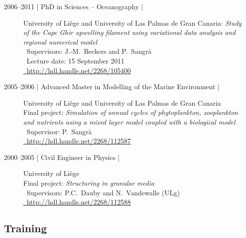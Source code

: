 \documentclass[10pt,a4paper,svgnames]{article}
\begin{document}
\begin{description}
\item[2006--2011 | PhD in Sciences -- Oceanography |] University of Li\`{e}ge and University of Las Palmas de Gran Canaria: \emph{Study of the Cape Ghir upwelling filament using variational data analysis and regional numerical model}\\
\faUser~Supervisors: J.-M.~Beckers and P.~Sangr\`{a}\\
\faCalendar~Lecture date: 15 September 2011\\
\href{http://hdl.handle.net/2268/105400}{\faLink~http://hdl.handle.net/2268/105400}

\item[2005--2006 | Advanced Master in Modelling of the Marine Environment |] University of Li\`{e}ge and University of Las Palmas de Gran Canaria\\
Final project: \emph{Simulation of annual cycles of phytoplankton, zooplankton and nutrients using a mixed layer model coupled with a biological model}\\
\faUser~Supervisor: P.~Sangr\`{a}\\
\href{http://hdl.handle.net/2268/112587}{\faLink~http://hdl.handle.net/2268/112587}

\item[2000--2005 | Civil Engineer in Physics | ] University of Li\`{e}ge\\
Final project: \emph{Structuring in granular media}\\
\faUser~Supervisors: P.C.~Dauby and N.~Vandewalle (ULg)\\
\href{http://hdl.handle.net/2268/112588}{\faLink~http://hdl.handle.net/2268/112588}


\end{description}


\subsection{Training}
\end{document}
